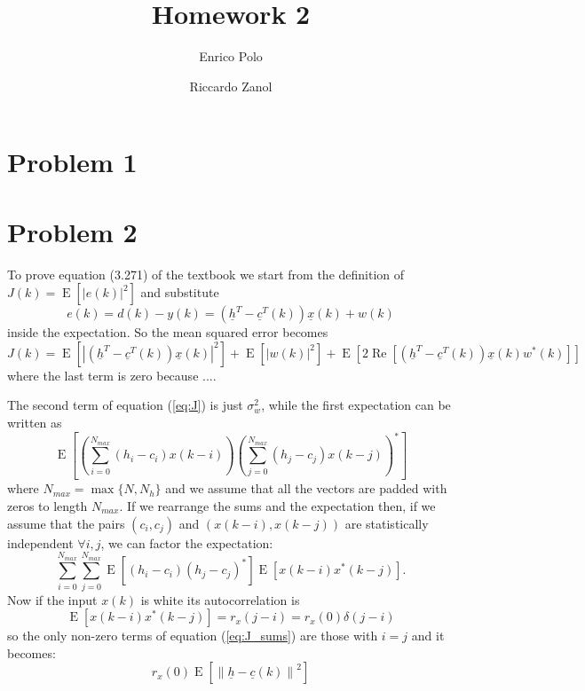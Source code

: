 \documentclass{article}
\author{Enrico Polo \and Riccardo Zanol}
\title{Homework 2}
\renewcommand{\vec}[1]{\underline{#1}}
\renewcommand{\Re}[1]{\operatorname{Re}\left[#1\right]}
\newcommand{\E}[1]{\operatorname{E}\left[#1\right]}
\newcommand{\norm}[1]{\left\lVert#1\right\rVert}
\newcommand{\abs}[1]{\left|#1\right|}
\begin{document}
\maketitle
\section*{Problem 1}
\section*{Problem 2}
To prove equation (3.271) of the textbook we start from the definition
of $J(k) = \E{\abs{e(k)}^2}$ and substitute
\[ e(k) = d(k) - y(k) = \left(\vec{h}^T - \vec{c}^T(k) \right) \vec{x}(k) + w(k) \]
inside the expectation. So the mean squared error becomes
\begin{equation}
  J(k) = \E{\abs{\left(\vec{h}^T - \vec{c}^T(k) \right) \vec{x}(k)}^2}
  + \E{\abs{w(k)}^2}
  + \E{2\Re{\left(\vec{h}^T - \vec{c}^T(k) \right) \vec{x}(k) w^*(k)}}
  \label{eq:J}
\end{equation}
{\color{red} where the last term is zero because ...}.

The second term of equation (\ref{eq:J}) is just $\sigma^2_w$, while
the first expectation can be written as
\[ \E{
  \left(\sum_{i=0}^{N_{max}}\left(h_i - c_i\right)x(k-i)\right)
  \left(\sum_{j=0}^{N_{max}}\left(h_j - c_j\right)x(k-j)\right)^* } \]
where $N_{max} = \max\{N, N_h\}$ and we assume that all the vectors
are padded with zeros to length $N_{max}$.  If we rearrange the sums
and the expectation then, {\color{red} if we assume that the pairs
  $(c_i,c_j)$ and $(x(k-i),x(k-j))$ are statistically independent
  $\forall i,j$}, we can factor the expectation:
\begin{equation}
\sum_{i=0}^{N_{max}}\sum_{j=0}^{N_{max}}
\E{(h_i -c_i)(h_j-c_j)^*}
\E{x(k-i)x^*(k-j)} .
\label{eq:J_sums}
\end{equation}
Now if the input $x(k)$ is white its autocorrelation is
\[
\E{x(k-i)x^*(k-j)} = r_x(j-i) = r_x(0)\delta(j-i)
\]
so the only non-zero terms of equation (\ref{eq:J_sums}) are those
with $i=j$ and it becomes:
\begin{equation}
  r_x(0)\E{\norm{\vec{h}-\vec{c}(k)}^2}
  \label{eq:J_final_diff}
\end{equation}
\end{document}
